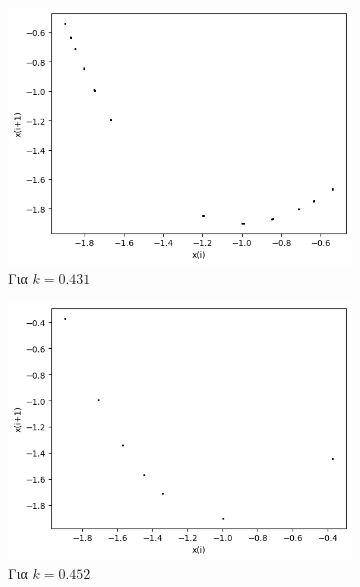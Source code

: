 \begin{figure}[ht]
	\centering
	
	\begin{subfigure}[b]{0.4\textwidth}
		\centering
		\includegraphics[width=\textwidth]{LateX images/graphs q19/g3}
		\caption{Για $k=0.431$}
		\label{f:k92}
	\end{subfigure}
	\hfill
	\begin{subfigure}[b]{0.4\textwidth}
		\centering
		\includegraphics[width=\textwidth]{LateX images/graphs q19/g4}
		\caption{Για $k=0.452$}
		\label{f:k93}
	\end{subfigure}
	\hfill
	\begin{subfigure}[b]{0.4\textwidth}
		\centering

\end{subfigure}
\end{figure}
